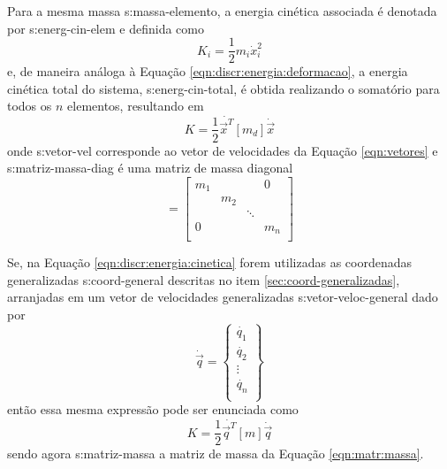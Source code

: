 \documentclass[12pt,openright,oneside,a4paper,
	chapter=TITLE,section=TITLE,
	english,brazil]{abntex2}
\begin{document}
	Para a mesma massa \gls{s:massa-elemento}, a energia cinética associada é denotada por \gls{s:energ-cin-elem} e definida como \cite{rao:2008}
	\begin{equation}
		K_i = \frac{1}{2}m_i\dot{x}_i^2
	\end{equation}
	e, de maneira análoga à Equação \ref{eqn:discr:energia:deformacao}, a energia cinética total do sistema, \gls{s:energ-cin-total}, é obtida realizando o somatório para todos os $ n $ elementos, resultando em \cite{savi:2017}
	\begin{equation}\label{eqn:discr:energia:cinetica}
		K = \frac{1}{2}\dot{\vec{x}^T}[m_d]\dot{\vec{x}}
	\end{equation}
	onde \gls{s:vetor-vel} corresponde ao vetor de velocidades da Equação \ref{eqn:vetores} e \gls{s:matriz-massa-diag} é uma matriz de massa diagonal
	\begin{equation}
		[m_d] =
		\begin{bmatrix}
			m_1 & & & 0\\
			& m_2\\
			& & \ddots\\
			0 & & & m_n\\
		\end{bmatrix}
	\end{equation}
	
	Se, na Equação \ref{eqn:discr:energia:cinetica} forem utilizadas as coordenadas generalizadas \gls{s:coord-general} descritas no item \ref{sec:coord-generalizadas}, arranjadas em um vetor de velocidades generalizadas \gls{s:vetor-veloc-general} dado por
	\begin{equation}
		\dot{\vec{q}} = 
		\begin{Bmatrix}
			\dot{q_1}\\ \dot{q_2}\\ \vdots\\ \dot{q_n}\\
		\end{Bmatrix}
	\end{equation}
	então essa mesma expressão pode ser enunciada como \cite{rao:2008}
	\begin{equation}
		K = \frac{1}{2}\dot{\vec{q}^T}[m]\dot{\vec{q}}
	\end{equation}
	sendo agora \gls{s:matriz-massa} a matriz de massa da Equação \ref{eqn:matr:massa}.
	
\end{document}
